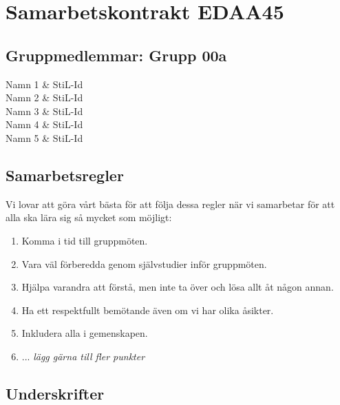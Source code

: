 \documentclass[12pt]{article} %
\begin{document}
\clearpage
\thispagestyle{empty}

\section*{Samarbetskontrakt EDAA45}

\subsection*{Gruppmedlemmar: Grupp 00a}

\noindent 
Namn 1 \& StiL-Id \\ 
Namn 2 \& StiL-Id \\ 
Namn 3 \& StiL-Id \\ 
Namn 4 \& StiL-Id \\ 
Namn 5 \& StiL-Id \\ 

\subsection*{Samarbetsregler}
Vi lovar att göra vårt bästa för att följa dessa regler när vi samarbetar för att alla ska lära sig så mycket som möjligt: 
\begin{enumerate}
\item Komma i tid till gruppmöten.
\item Vara väl förberedda genom självstudier inför gruppmöten.
\item Hjälpa varandra att förstå, men inte ta över och lösa allt åt någon annan.
\item Ha ett respektfullt bemötande även om vi har olika åsikter.
\item Inkludera alla i gemenskapen.
\item ... \emph{lägg gärna till fler punkter}
\end{enumerate}

\subsection*{Underskrifter}

~

\newcommand{\Vsp}{0.5cm}
\newcommand{\Hsp}{7cm}
 
\noindent\vspace{\Vsp}\makebox[\Hsp]{\dotfill}

\noindent\vspace{\Vsp}\makebox[\Hsp]{\dotfill}
\end{document}

